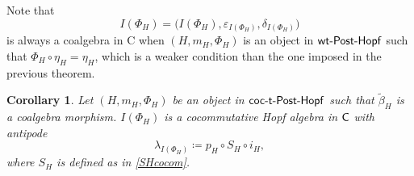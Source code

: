\documentclass[pdftex]{sigma}
\numberwithin{equation}{section}
\newtheorem{Corollary}[Theorem]{Corollary}
\begin{document}
\begin{Remark}
Note that
\[
I(\Phi_{H})=\big(I(\Phi_{H}),\varepsilon_{I(\Phi_{H})},\delta_{I(\Phi_{H})}\big)
\]
is always a coalgebra in {\sf C} when $(H,m_{H},\Phi_{H})$ is an object in ${\sf wt}\textnormal{-}\sf{Post}\textnormal{-}\sf{Hopf}$ such that $\Phi_{H}\circ\eta_{H}=\eta_{H}$, which is a weaker condition than the one imposed in the previous theorem.
\end{Remark}
\begin{Corollary}\label{halgIphi}
Let $(H,m_{H},\Phi_{H})$ be an object in $\sf{coc}\textnormal{-}\sf{t}\textnormal{-}\sf{Post}\textnormal{-}\sf{Hopf}$ such that $\tilde{\beta}_{H}$ is a coalgebra morphism. $I(\Phi_{H})$ is a cocommutative Hopf algebra in $\sf{C}$ with antipode
\begin{equation}\label{deflambdaI}
\lambda_{I(\Phi_{H})}\coloneqq p_{H}\circ S_{H}\circ i_{H},
\end{equation}
where $S_{H}$ is defined as in \eqref{SHcocom}.
\end{Corollary}
\end{document}
